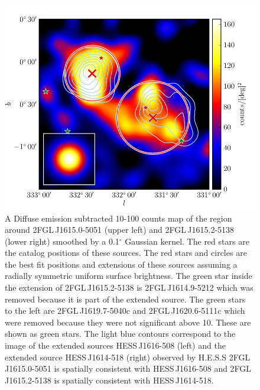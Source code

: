 \documentclass[12pt,preprint]{aastex}
\newcommand{\gev}{\text{GeV}\xspace}
\newcommand{\tev}{\text{TeV}\xspace}
\renewcommand{\deg}{\ensuremath{^\circ}\xspace}
\begin{document}
\begin{figure}
  \begin{center}
    \includegraphics[type=pdf,ext=.pdf,read=.pdf]{source_plots/source_1FGL_J1613.6-5100c}
  \end{center}
  \caption{
    A Diffuse emission subtracted 10-100
    \gev counts map of the region around 2FGL\,J1615.0-5051 (upper
    left) and 2FGL\,J1615.2-5138 (lower right) smoothed by a 0.1\deg
    Gaussian kernel.  The red stars are the catalog positions of these
    sources.  The red stars and circles are the best fit positions and
    extensions of these sources 
    assuming a radially
    symmetric uniform surface brightness.
    The green star inside the extension of 2FGL\,J1615.2-5138  is
    2FGL\,J1614.9-5212 which was removed because it is part of the
    extended source.  The green stars to the left are 2FGL\,J1619.7-5040c
    and 2FGL\,J1620.6-5111c which were removed because they were
    not significant above 10\gev. These are shown as green stars.
    The light blue
    contours correspond to the \tev image 
    of the extended sources
    HESS\,J1616-508 (left) and the extended source HESS\,J1614-518
    (right)
    observed by H.E.S.S
    \citep{hess_plane_survey}
    2FGL\,J1615.0-5051 is spatially consistent with HESS\,J1616-508 and
    2FGL\,J1615.2-5138 is spatially consistent with HESS\,J1614-518.
  }\label{1FGL_J1613.6-5100c}
\end{figure}
\end{document}
